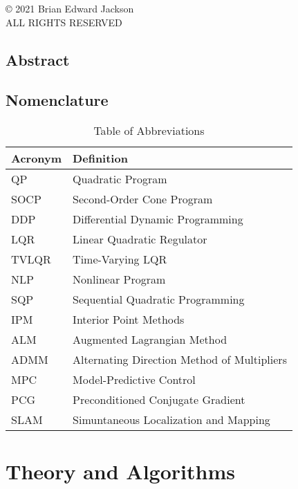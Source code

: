 \documentclass[10pt,oneside]{book}
\begin{document}
    

    \frontmatter
    
    \newpage
    \pagestyle{empty}
    \begin{center}
    \copyright{} 2021 Brian Edward Jackson \\
    ALL RIGHTS RESERVED
    \end{center}
    
    \chapter*{Abstract}
    \blindtext[1]

    \tableofcontents
    \listoffigures
    \listoftables

    \chapter*{Nomenclature}
    \begin{table}[h]
    \centering
    \begin{tabular}{l l}
            Acronym & Definition \\
            \midrule
            QP   & Quadratic Program \\
            SOCP & Second-Order Cone Program \\
            DDP  & Differential Dynamic Programming \\
            LQR  & Linear Quadratic Regulator \\
            TVLQR & Time-Varying LQR \\
            NLP  & Nonlinear Program \\
            SQP  & Sequential Quadratic Programming \\
            IPM  & Interior Point Methods \\
            ALM  & Augmented Lagrangian Method \\
            ADMM & Alternating Direction Method of Multipliers \\
            MPC  & Model-Predictive Control \\
            PCG  & Preconditioned Conjugate Gradient \\
            SLAM & Simuntaneous Localization and Mapping \\
    \end{tabular}
    \caption{Table of Abbreviations}
    \label{tab:abbreviations}
    \end{table}
    

    \mainmatter
    \pagestyle{fancy}
    

    

    \part{Theory and Algorithms} \label{part:theory}
    

    \appendix
    
    

    \printbibliography
    
\end{document}
